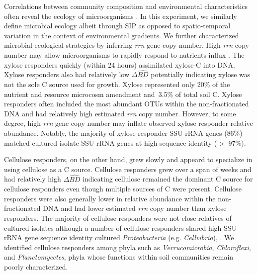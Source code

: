 Correlations between community composition and environmental characteristics
often reveal the ecology of microorganisms \citep{Fierer2007}. In this
experiment, we similarly define microbial ecology albeit through SIP as opposed
to spatio-temporal variation in the context of environmental gradients. We
further characterized microbial ecological strategies by inferring \textit{rrn}
gene copy number. High \textit{rrn} copy number may allow microorganisms to
rapidly respond to nutrients influx \citep{Klappenbach_2000}. The xylose
responders quickly (within 24 hours) assimilated xylose-C into DNA. Xylose
responders also had relatively low
$\Delta\hat{BD}$ potentially indicating xylose was not the sole C source
used for growth. Xylose represented only 20\% of the nutrient and resource
microcosm amendment and~3.5\% of total soil C. Xylose responders often included
the most abundant OTUs within the non-fractionated DNA and had relatively high
estimated \textit{rrn} copy number. However, to some degree, high \textit{rrn}
gene copy number may inflate observed xylose responder relative abundance.
Notably, the majority of xylose responder SSU rRNA genes (86\%) matched
cultured isolate SSU rRNA genes at high sequence identity ($>$ 97\%). 

Cellulose responders, on the other hand, grew slowly and appeard to specialize
in using cellulose as a C source. Cellulose responders grew over a span of weeks
and had relatively high $\Delta\hat{BD}$ indicating cellulose remained the
dominant C source for cellulose responders even though multiple sources of
C were present. Cellulose responders were also generally lower in relative
abundance within the non-fractionated DNA and had lower estimated \textit{rrn}
copy number than xylose responders. The majority of cellulose responders were
not close relatives of cultured isolates although a number of cellulose
responders shared high SSU rRNA gene sequence identity cultured
\textit{Proteobacteria} (e.g. \textit{Cellvibrio}), . We identified cellulose
responders among phyla such as \textit{Verrucomicrobia}, \textit{Chloroflexi},
and \textit{Planctomycetes}, phyla whose functions within soil communities
remain poorly characterized.

